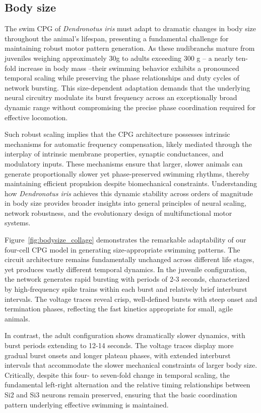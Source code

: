 \documentclass[nofootinbib,aip,amsmath,amssymb,reprint,twocolumn,10pt]{revtex4-2}
\begin{document}
\subsection{Body size}


The swim CPG of \textit{Dendronotus iris} must adapt to dramatic changes in body size throughout the animal’s lifespan, presenting a fundamental challenge for maintaining robust motor pattern generation. As these nudibranchs mature from juveniles weighing approximately 30g to adults exceeding 300 g -- a nearly ten-fold increase in body mass --their swimming behavior exhibits a pronounced temporal scaling while preserving the phase relationships and duty cycles of network bursting. This size-dependent adaptation demands that the underlying neural circuitry modulate its burst frequency across an exceptionally broad dynamic range without compromising the precise phase coordination required for effective locomotion.

Such robust scaling implies that the CPG architecture possesses intrinsic mechanisms for automatic frequency compensation, likely mediated through the interplay of intrinsic membrane properties, synaptic conductances, and modulatory inputs. These mechanisms ensure that larger, slower animals can generate proportionally slower yet phase-preserved swimming rhythms, thereby maintaining efficient propulsion despite biomechanical constraints. Understanding how \textit{Dendronotus iris} achieves this dynamic stability across orders of magnitude in body size provides broader insights into general principles of neural scaling, network robustness, and the evolutionary design of multifunctional motor systems.


Figure~\ref{fig:bodysize_collage} demonstrates the remarkable adaptability of our four-cell CPG model in generating size-appropriate swimming patterns. The circuit architecture remains fundamentally unchanged across different life stages, yet produces vastly different temporal dynamics. In the juvenile configuration, the network generates rapid bursting with periods of 2-3 seconds, characterized by high-frequency spike trains within each burst and relatively brief interburst intervals. The voltage traces reveal crisp, well-defined bursts with steep onset and termination phases, reflecting the fast kinetics appropriate for small, agile animals.

In contrast, the adult configuration shows dramatically slower dynamics, with burst periods extending to 12-14 seconds. The voltage traces display more gradual burst onsets and longer plateau phases, with extended interburst intervals that accommodate the slower mechanical constraints of larger body size. Critically, despite this four- to seven-fold change in temporal scaling, the fundamental left-right alternation and the relative timing relationships between Si2 and Si3 neurons remain preserved, ensuring that the basic coordination pattern underlying effective swimming is maintained.
\end{document}
